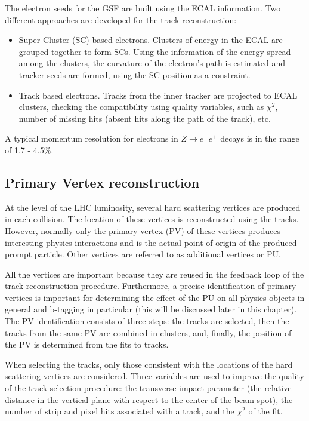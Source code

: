 The electron seeds for the GSF are built using the ECAL information. Two different approaches are developed for the track reconstruction:

\begin{itemize}

\item Super Cluster (SC) based electrons. Clusters of energy in the ECAL are grouped together to form SCs. Using the information of the energy spread among the clusters, the curvature of the electron's path is estimated and tracker seeds are formed, using the SC position as a constraint. 
\item Track based electrons. Tracks from the inner tracker are projected to ECAL clusters, checking the compatibility using quality variables, such as $\chi^2$, number of missing hits (absent hits along the path of the track), etc. 
\end{itemize}

A typical momentum resolution for electrons in $Z \rightarrow e^- e^+$ decays is in the range of 1.7 - 4.5$\%$.

\subsection{Primary Vertex reconstruction}\label{sec:PV_reconstruction}

At the level of the LHC luminosity, several hard scattering vertices are produced in each collision. The location of these vertices is reconstructed using the tracks. However, normally only the primary vertex (PV) of these vertices produces interesting physics interactions and is the actual point of origin of the produced prompt particle. Other vertices are referred to as additional vertices or PU. 

All the vertices are important because they are reused in the feedback loop of the track reconstruction procedure. Furthermore, a precise identification of primary vertices is important for determining the effect of the PU on all physics objects in general and b-tagging in particular (this will be discussed later in this chapter). The PV identification consists of three steps: the tracks are selected, then the tracks from the same PV are combined in clusters, and, finally, the position of the PV is determined from the fits to tracks. 

When selecting the tracks, only those consistent with the locations of the hard scattering vertices are considered. Three variables are used to improve the quality of the track selection procedure: the transverse impact parameter (the relative distance in the vertical plane with respect to the center of the beam spot), the number of strip and pixel hits associated with a track, and the $\chi^2$ of the fit.

